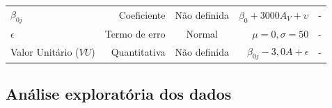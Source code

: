 \documentclass[
  a4paper, 11pt]{article}
\begin{document}
\begin{longtable}[]{@{}lrcrc@{}}
\begin{minipage}[t]{0.18\columnwidth}
\(\beta_{0j}\)\strut
\end{minipage} & \begin{minipage}[t]{0.12\columnwidth}\raggedleft
Coeficiente\strut
\end{minipage} & \begin{minipage}[t]{0.11\columnwidth}\centering
Não definida\strut
\end{minipage} & \begin{minipage}[t]{0.25\columnwidth}\raggedleft
\(\beta_0 + 3000A_V + \upsilon\)\strut
\end{minipage} & \begin{minipage}[t]{0.21\columnwidth}\centering
-\strut
\end{minipage}\tabularnewline
\begin{minipage}[t]{0.18\columnwidth}\raggedright
\(\epsilon\)\strut
\end{minipage} & \begin{minipage}[t]{0.12\columnwidth}\raggedleft
Termo de erro\strut
\end{minipage} & \begin{minipage}[t]{0.11\columnwidth}\centering
Normal\strut
\end{minipage} & \begin{minipage}[t]{0.25\columnwidth}\raggedleft
\(\mu = 0, \sigma = 50\)\strut
\end{minipage} & \begin{minipage}[t]{0.21\columnwidth}\centering
-\strut
\end{minipage}\tabularnewline
\begin{minipage}[t]{0.18\columnwidth}\raggedright
Valor Unitário (\(VU\))\strut
\end{minipage} & \begin{minipage}[t]{0.12\columnwidth}\raggedleft
Quantitativa\strut
\end{minipage} & \begin{minipage}[t]{0.11\columnwidth}\centering
Não definida\strut
\end{minipage} & \begin{minipage}[t]{0.25\columnwidth}\raggedleft
\(\beta_{0j} - 3,0 A + \epsilon\)\strut
\end{minipage} & \begin{minipage}[t]{0.21\columnwidth}\centering
-\strut
\end{minipage}\tabularnewline
\bottomrule
\end{longtable}

\hypertarget{anuxe1lise-exploratuxf3ria-dos-dados}{%
\subsection{Análise exploratória dos
dados}\label{anuxe1lise-exploratuxf3ria-dos-dados}}
\end{document}
